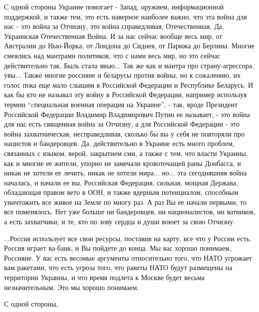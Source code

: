 С одной стороны Украине помогает - Запад, оружием, информационной поддержкой, и
также тем, это есть наверное наиболее важно, что эта война для нас - это война
за Отчизну, это война справедливая, Отечественная. Да, Украинская Отечественная
Война. И за нас сейчас вообще весь мир, от Австралии до Нью-Йорка, от Лондона
до Сиднея, от Парижа до Берлина. Многие смеялись над мантрами политиков, что с
нами весь мир, но это сейчас действительно так.  Быль стала явью... Так же как
и мантра про страну-агрессора, увы...  Также многие россияне и беларусы против
войны, но к сожалению, их голос пока еще мало слышим в Российской Федерации и
Республике Беларусь. И как бы кто не называл эту войну в Российской Федерации,
например используя термин \enquote{cпециальная военная операция на Украине}, -
так, вроде Президент Российской Федерации Владимир Владимирович Путин ее
называет, - это война для нас есть священная война за Отчизну, а для Российской
Федерации - это война захватническая, несправедливая, сколько бы вы у себя не
повторяли про нацистов и бандеровцев. Да, действительно в Украине есть много
проблем, связанных с языком, верой, закрытием сми, а также с тем, что власти
Украины, как и многие ее жители, упорно не замечали кровоточащей раны Донбасса,
и никак не хотели ее лечить, никак не хотели мира... но... эта сегодняшняя
война началась, и начали ее вы, Российская Федерация, сильная, мощная Держава,
обладающая правом вето в ООН, и также ядерным потенциалом, способным уничтожить
все живое на Земле по многу раз. А раз Вы ее начали первыми, то все поменялось.
Нет уже больше ни бандеровцев, ни националистов, ни ватников, а есть
захватчики, и те, кто по зову сердца и души воюет за свою Отчизну.

...Россия использует все свои ресурсы, поставив на карту, все что у России
есть. Россия играет ва-банк, и Вы пойдете до конца. Мы вас хорошо понимаем,
Россияне. У вас есть весомые аргументы относительно того, что НАТО угрожает вам
ракетами, что есть угроза того, что ракеты НАТО будут размещены на территории
Украины, и что время подлета к Москве будет весьма незначительным. Это мы
хорошо понимаем. 

С одной стороны,
